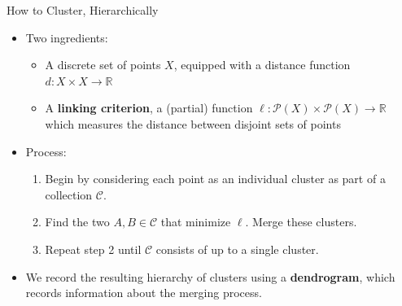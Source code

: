 \documentclass{beamer}
\begin{document}
\begin{frame}{How to Cluster, Hierarchically}
  \begin{itemize}
    \item Two ingredients:
    \begin{itemize}
      \item A discrete set of points $X$, equipped with a distance function $d:X\times X\to\mathbb{R}$
      \item A \textbf{linking criterion}, a (partial) function $\ell: \mathscr{P}(X)\times\mathscr{P}(X)\to\mathbb{R}$ which measures the distance between disjoint sets of points
    \end{itemize}
    \item Process:
    \begin{enumerate}
      \item Begin by considering each point as an individual cluster as part of a collection $\mathcal{C}$.
      \item Find the two $A,B\in\mathcal{C}$ that minimize $\ell$. Merge these clusters.
      \item Repeat step 2 until $\mathcal{C}$ consists of up to a single cluster.
    \end{enumerate}
    \item We record the resulting hierarchy of clusters using a \textbf{dendrogram}, which records information about the merging process.
  \end{itemize}
\end{frame}
\end{document}

